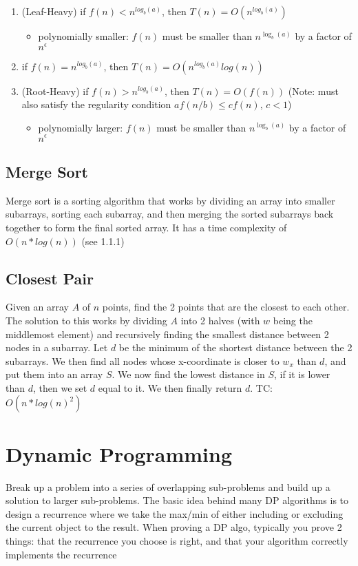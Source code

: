 \documentclass{article}
\begin{document}
\begin{enumerate}
    \item (Leaf-Heavy) if $f(n) < n^{log_b(a)}$, then  $T(n) = O(n^{log_b(a)})$
    \begin{itemize}
        \item polynomially smaller: $f(n)$ must be smaller than $n^{\log_b(a)}$ by a factor of $n^{\epsilon}$
    \end{itemize}
    \item if $f(n) = n^{log_b(a)}$, then $T(n) = O(n^{log_b(a)}log(n))$
    \item (Root-Heavy) if $f(n) > n^{log_b(a)}$, then $T(n) = O(f(n))$ (Note: must also satisfy the regularity condition $af(n/b) \leq cf(n)$, $c < 1$)
    \begin{itemize}
        \item polynomially larger: $f(n)$ must be smaller than $n^{\log_b(a)}$ by a factor of $n^{\epsilon}$
    \end{itemize}
\end{enumerate}

\subsection{Merge Sort}
Merge sort is a sorting algorithm that works by dividing an array into smaller subarrays, sorting each subarray, and then merging the sorted subarrays back together to form the final sorted array. It has a time complexity of $O(n*log(n))$ (see 1.1.1)

\subsection{Closest Pair}
Given an array $A$ of $n$ points, find the 2 points that are the closest to each other. 
The solution to this works by dividing $A$ into 2 halves (with $w$ being the middlemost element) and recursively finding the smallest
distance between 2 nodes in a subarray. Let $d$ be the minimum of the shortest distance between
the 2 subarrays. We then find all nodes whose x-coordinate is closer to $w_x$ than $d$, and
put them into an array $S$. We now find the lowest distance in $S$, if it is lower than $d$, 
then we set $d$ equal to it. We then finally return $d$. TC: $O(n*log(n)^2)$

\section{Dynamic Programming}
Break up a problem into a series of overlapping sub-problems and build up a solution to larger sub-problems.
The basic idea behind many DP algorithms is to design a recurrence where we take the max/min of either including or excluding the current
object to the result. When proving a DP algo, typically you prove 2 things: that the recurrence you choose is right, and 
that your algorithm correctly implements the recurrence
\end{document}
